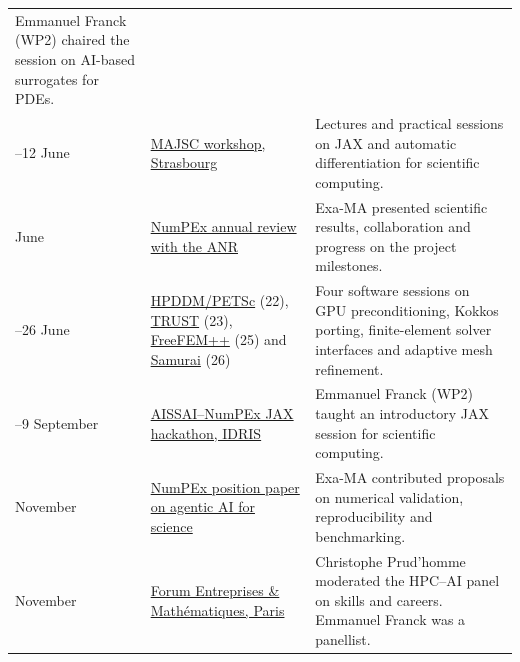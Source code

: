 \begin{longtable}{@{}%
  >{\raggedright\arraybackslash}p{}
  >{\raggedright\arraybackslash}p{}
  >{\raggedright\arraybackslash}p{}@{}}
Emmanuel Franck (WP2) chaired the session on AI-based surrogates for PDEs.\\
8--12 June &
\href{https://majsc2026.pages.math.unistra.fr/program.html}{MAJSC workshop, Strasbourg} &
Lectures and practical sessions on JAX and automatic differentiation
for scientific computing.\\
11 June &
\href{https://exa-ma.numpex.fr/news/archive.html}{NumPEx annual review with the ANR} &
Exa-MA presented scientific results, collaboration and progress on the
project milestones.\\
22--26 June &
\href{https://exa-ma.numpex.fr/news/2026/20260622-hpddm-petsc-framework-webinar.html}{HPDDM/PETSc} (22),
\href{https://exa-ma.numpex.fr/news/2026/20260623-trust-framework-webinar.html}{TRUST} (23),
\href{https://exa-ma.numpex.fr/news/2026/20260625-freefem-framework-webinar.html}{FreeFEM++} (25) and
\href{https://exa-ma.numpex.fr/news/2026/20260626-samurai-framework-webinar.html}{Samurai} (26) &
Four software sessions on GPU preconditioning, Kokkos porting,
finite-element solver interfaces and adaptive mesh refinement.\\
7--9 September &
\href{https://aissai-jaxhack.sciencesconf.org/}{AISSAI--NumPEx JAX hackathon, IDRIS} &
Emmanuel Franck (WP2) taught an introductory JAX session for scientific computing.\\
6 November &
\href{https://numpex.org/4252/}{NumPEx position paper on agentic AI for science} &
Exa-MA contributed proposals on numerical validation, reproducibility
and benchmarking.\\
17 November &
\href{https://exa-ma.numpex.fr/news/2026/20261117-fem.html}{Forum Entreprises \& Mathématiques, Paris} &
Christophe Prud'homme moderated the HPC--AI panel on skills and careers.
Emmanuel Franck was a panellist.\\
\end{longtable}
\endgroup
